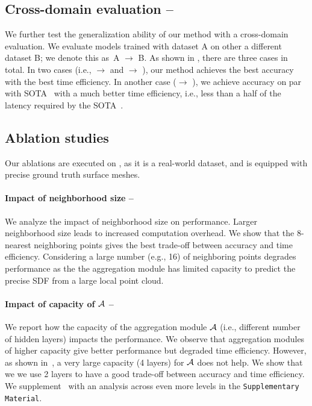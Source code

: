 \subsection{Cross-domain evaluation -- }
We further test the generalization ability of our method with a cross-domain evaluation.
We evaluate models trained with dataset A on other a different dataset B; we denote this as~A $\rightarrow$ B. 
As shown in , there are three cases in total.
In two cases (i.e., \synthetic $\rightarrow$ \scannet and \scannet $\rightarrow$ \synthetic), our method achieves the best accuracy with the best time efficiency. 
In another case (\scannet $\rightarrow$ \scenenn), we achieve accuracy on par with SOTA~\cite{huang2023neural} with a much better time efficiency, i.e., less than a half of the latency required by the SOTA~\cite{huang2023neural}.

\subsection{Ablation studies}
Our ablations are executed on \scannet, as it is a real-world dataset, and is equipped with precise ground truth surface meshes.


\paragraph{Impact of neighborhood size -- }
We analyze the impact of neighborhood size on performance. Larger neighborhood size leads to increased computation overhead. 
We show that the 8-nearest neighboring points gives the best trade-off between accuracy and time efficiency.
Considering a large number (e.g., 16) of neighboring points degrades performance as the the aggregation module has limited capacity to predict the precise SDF from a large local point cloud.


\paragraph{Impact of capacity of $\mathcal{A}$ -- } 
We report how the capacity of the aggregation module $\mathcal{A}$ (i.e., different number of hidden layers) impacts the performance.
We observe that aggregation modules of higher capacity give better performance but degraded time efficiency. However, as shown in~, a very large capacity (4 layers) for $\mathcal{A}$ does not help.
We show that we we use 2 layers to have a good trade-off between accuracy and time efficiency. 
We supplement~ with an analysis across even more levels in the \texttt{Supplementary Material}.

